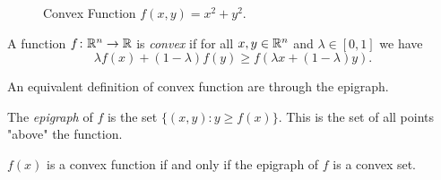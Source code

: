 \documentclass[../open-optimization/open-optimization.tex]{subfiles}
\begin{document}
\begin{figure}[H]
\begin{center}
\end{center}
    \caption{Convex Function $f(x,y) = x^2 + y^2$.}
\end{figure} 





\begin{definition}
A function $f \colon {\mathbb{R}}^n \to {\mathbb{R}}$ is \emph{convex} if for all $x,y \in {\mathbb{R}}^n$ and $\lambda \in [0,1]$ we have 
\begin{equation}
\lambda f(x) + (1-\lambda)f(y) \geq f(\lambda x + (1-\lambda) y).
\end{equation}
\end{definition}



\begin{figure}[H]


\end{figure}



An equivalent definition of convex function are through the epigraph.

\begin{definition}[Epigraph]
The \emph{epigraph} of $f$ is the set $\{(x,y) : y \geq f(x)\}$.  This is the set of all points "above" the function.
\end{definition}

\begin{theorem}
$f(x)$ is a convex function if and only if the epigraph of $f$ is a convex set.
\end{theorem}
\end{document}
